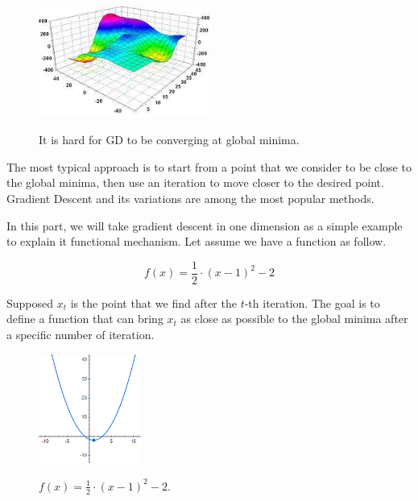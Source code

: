 	\begin{figure}[H]
		\centering
		{\includegraphics[width=0.5\textwidth]{./hinhanh/chap3/flutuate_plate.jpg}}
		\caption{It is hard for GD to be converging at global minima.}
		\label{fig:flutuate_plate}
	\end{figure}
	
	
	The most typical approach is to start from a point that we consider to be close to the global minima, then use an iteration to move closer to the desired point. Gradient Descent \cite{gdoverview} and its variations are among the most popular methods.
	
	In this part, we will take gradient descent in one dimension as a simple example to explain it functional mechanism. Let assume we have a function as follow.
	
	\[f(x) = \frac{1}{2} \cdot (x - 1)^2 -2\]
	
	Supposed $x_t$ is the point that we find after the $t$-th iteration. The goal is to define a function that can bring $x_t$ as close as possible to the global minima after a specific number of iteration.
	
	\begin{figure}[H]
		\centering
		{\includegraphics[width=0.3\textwidth]{./hinhanh/chap3/simple_f(x).png}}
		\caption{$ f(x) = \frac{1}{2} \cdot (x - 1)^2 -2 $.}
		\label{fig:simple_f(x)}
	\end{figure}
	

